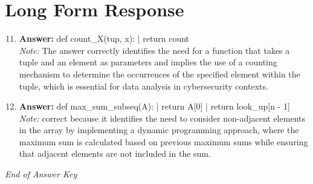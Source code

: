\documentclass[12pt]{article}
\begin{document}
\section*{Long Form Response}
\begin{enumerate}[label=\arabic*.]
\setcounter{enumi}{10}
\item \textbf{Answer:} def count\_X(tup, x): | return count
\\ \textit{Note:} The answer correctly identifies the need for a function that takes a tuple and an element as parameters and implies the use of a counting mechanism to determine the occurrences of the specified element within the tuple, which is essential for data analysis in cybersecurity contexts.
\item \textbf{Answer:} def max\_sum\_subseq(A): | return A[0] | return look\_up[n - 1]
\\ \textit{Note:} correct because it identifies the need to consider non-adjacent elements in the array by implementing a dynamic programming approach, where the maximum sum is calculated based on previous maximum sums while ensuring that adjacent elements are not included in the sum.
\end{enumerate}

\vfill
\noindent\textit{End of Answer Key}
\end{document}
